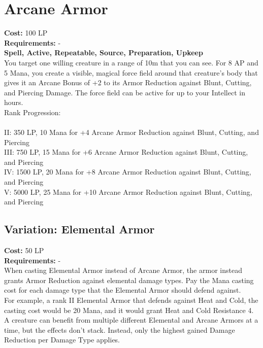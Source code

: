 \section{Arcane Armor}\label{spell:arcaneArmor}
\textbf{Cost:} 100 LP\\
\textbf{Requirements:} -\\
\textbf{Spell, Active, Repeatable, Source, Preparation, Upkeep}\\
You target one willing creature in a range of 10m that you can see.
For 8 AP and 5 Mana, you create a visible, magical force field around that creature's body that gives it an Arcane Bonus of +2 to its Armor Reduction against Blunt, Cutting, and Piercing Damage.
The force field can be active for up to your Intellect in hours.
\\
Rank Progression:\\
\\
II: 350 LP, 10 Mana for +4 Arcane Armor Reduction against Blunt, Cutting, and Piercing\\
III: 750 LP, 15 Mana for +6 Arcane Armor Reduction against Blunt, Cutting, and Piercing\\
IV: 1500 LP, 20 Mana for +8 Arcane Armor Reduction against Blunt, Cutting, and Piercing\\
V: 5000 LP, 25 Mana for +10 Arcane Armor Reduction against Blunt, Cutting, and Piercing\\

\subsection{Variation: Elemental Armor}\label{spell:elementalArmor}
\textbf{Cost:} 50 LP\\
\textbf{Requirements:} -\\
When casting Elemental Armor instead of Arcane Armor, the armor instead grants Armor Reduction against elemental damage types.
Pay the Mana casting cost for each damage type that the Elemental Armor should defend against.\\
For example, a rank II Elemental Armor that defends against Heat and Cold, the casting cost would be 20 Mana, and it would grant Heat and Cold Resistance 4.\\
A creature can benefit from multiple different Elemental and Arcane Armors at a time, but the effects don't stack.
Instead, only the highest gained Damage Reduction per Damage Type applies.